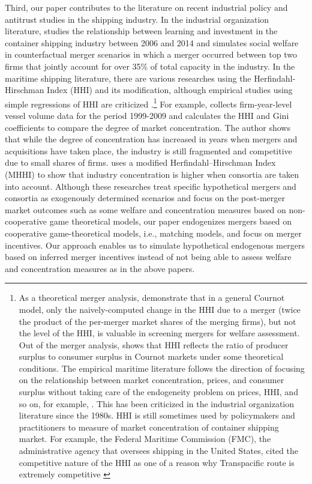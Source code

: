 \documentclass[10pt]{article}
\begin{document}
Third, our paper contributes to the literature on recent industrial policy and antitrust studies in the shipping industry. In the industrial organization literature, \cite{jeon2022learning} studies the relationship between learning and investment in the container shipping industry between 2006 and 2014 and simulates social welfare in counterfactual merger scenarios in which a merger occurred between top two firms that jointly account for over 35\% of total capacity in the industry.
In the maritime shipping literature, there are various researches using the Herfindahl-Hirschman Index (HHI) and its modification, although empirical studies using simple regressions of HHI are criticized \citep{bresnahan1989empirical}.\footnote{As a theoretical merger analysis, \cite{nocke2022concentration} demonstrate that in a general Cournot model, only the naively-computed change in the HHI due to a merger (twice the product of the per-merger market shares of the merging firms), but not the level of the HHI, is valuable in screening mergers for welfare assessment. Out of the merger analysis, \cite{spiegel2021herfindahl} shows that HHI reflects the ratio of producer surplus to consumer surplus in Cournot markets under some theoretical conditions. The empirical maritime literature follows the direction of \cite{spiegel2021herfindahl} focusing on the relationship between market concentration, prices, and consumer surplus without taking care of the endogeneity problem on prices, HHI, and so on, for example, \cite{Hirata2017}. This has been criticized in the industrial organization literature \citep{bresnahan1989empirical} since the 1980s. HHI is still sometimes used by policymakers and practitioners to measure of market concentration of container shipping market. For example, the Federal Maritime Commission (FMC), the administrative agency that oversees shipping in the United States, cited the competitive nature of the HHI as one of a reason why Transpacific route is extremely competitive \citep{FMC2022}} For example,
\cite{Sys2009TransPOL} collects firm-year-level vessel volume data for the period 1999-2009 and calculates the HHI and Gini coefficients to compare the degree of market concentration. 
The author shows that while the degree of concentration has increased in years when mergers and acquisitions have taken place, the industry is still fragmented and competitive due to small shares of firms.
\cite{Merk2022MEL} uses a modified Herfindahl–Hirschman Index (MHHI) to show that industry concentration is higher when consortia are taken into account.
Although these researches treat specific hypothetical mergers and consortia as exogenously determined scenarios and focus on the post-merger market outcomes such as some welfare and concentration measures based on non-cooperative game theoretical models, our paper endogenizes mergers based on cooperative game-theoretical models, i.e., matching models, and focus on merger incentives. 
Our approach enables us to simulate hypothetical endogenous mergers based on inferred merger incentives instead of not being able to assess welfare and concentration measures as in the above papers.
\end{document}
